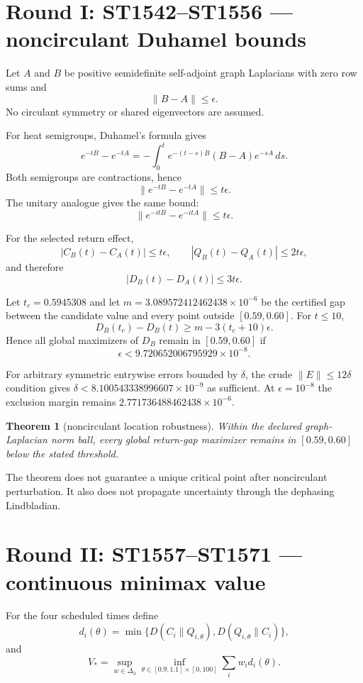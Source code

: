 \documentclass[11pt,a4paper]{article}
\newtheorem{theorem}{Theorem}\newcommand{\status}[1]{\textsf{[#1]}}
\begin{document}
\tableofcontents\newpage

\section{Round I: ST1542--ST1556 --- noncirculant Duhamel bounds}

Let $A$ and $B$ be positive semidefinite self-adjoint graph Laplacians with
zero row sums and
\[
\|B-A\|\le\epsilon.
\]
No circulant symmetry or shared eigenvectors are assumed.

For heat semigroups, Duhamel's formula gives
\[
e^{-tB}-e^{-tA}
=-\int_0^t e^{-(t-s)B}(B-A)e^{-sA}\,ds.
\]
Both semigroups are contractions, hence
\[
\|e^{-tB}-e^{-tA}\|\le t\epsilon.
\]
The unitary analogue gives the same bound:
\[
\|e^{-itB}-e^{-itA}\|\le t\epsilon.
\]

For the selected return effect,
\[
|C_B(t)-C_A(t)|\le t\epsilon,
\qquad
|Q_B(t)-Q_A(t)|\le2t\epsilon,
\]
and therefore
\[
|D_B(t)-D_A(t)|\le3t\epsilon.
\]

Let $t_c=0.5945308$ and let
$m=3.089572412462438\times10^{-6}$ be the certified gap between the candidate
value and every point outside $[0.59,0.60]$.  For $t\le10$,
\[
D_B(t_c)-D_B(t)
\ge m-3(t_c+10)\epsilon.
\]
Hence all global maximizers of $D_B$ remain in $[0.59,0.60]$ if
\[
\boxed{\epsilon<9.720652006795929\times10^{-8}.}
\]

For arbitrary symmetric entrywise errors bounded by $\delta$, the crude
$\|E\|\le12\delta$ condition gives
$\delta<8.100543338996607\times10^{-9}$ as sufficient.  At
$\epsilon=10^{-8}$ the exclusion margin remains
$2.771736488462438\times10^{-6}$.

\begin{theorem}[noncirculant location robustness]
Within the declared graph-Laplacian norm ball, every global return-gap
maximizer remains in $[0.59,0.60]$ below the stated threshold.
\end{theorem}

The theorem does not guarantee a unique critical point after noncirculant
perturbation.  It also does not propagate uncertainty through the dephasing
Lindbladian.

\section{Round II: ST1557--ST1571 --- continuous minimax value}

For the four scheduled times define
\[
d_i(\theta)=\min\{D(C_i\|Q_{i,\theta}),D(Q_{i,\theta}\|C_i)\},
\]
and
\[
V_*=\sup_{w\in\Delta_3}\inf_{\theta\in[0.9,1.1]\times[0,100]}
\sum_iw_id_i(\theta).
\]
\end{document}
